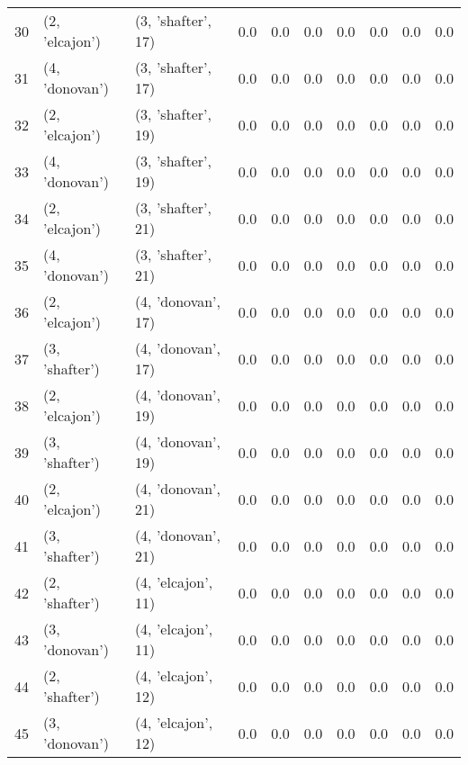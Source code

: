 \begin{tabular}{lllrrrrrrr}
30 &   (2, 'elcajon') &  (3, 'shafter', 17) &      0.0 &        0.0 &      0.0 &      0.0 &      0.0 &        0.0 &       0.0 \\
31 &   (4, 'donovan') &  (3, 'shafter', 17) &      0.0 &        0.0 &      0.0 &      0.0 &      0.0 &        0.0 &       0.0 \\
32 &   (2, 'elcajon') &  (3, 'shafter', 19) &      0.0 &        0.0 &      0.0 &      0.0 &      0.0 &        0.0 &       0.0 \\
33 &   (4, 'donovan') &  (3, 'shafter', 19) &      0.0 &        0.0 &      0.0 &      0.0 &      0.0 &        0.0 &       0.0 \\
34 &   (2, 'elcajon') &  (3, 'shafter', 21) &      0.0 &        0.0 &      0.0 &      0.0 &      0.0 &        0.0 &       0.0 \\
35 &   (4, 'donovan') &  (3, 'shafter', 21) &      0.0 &        0.0 &      0.0 &      0.0 &      0.0 &        0.0 &       0.0 \\
36 &   (2, 'elcajon') &  (4, 'donovan', 17) &      0.0 &        0.0 &      0.0 &      0.0 &      0.0 &        0.0 &       0.0 \\
37 &   (3, 'shafter') &  (4, 'donovan', 17) &      0.0 &        0.0 &      0.0 &      0.0 &      0.0 &        0.0 &       0.0 \\
38 &   (2, 'elcajon') &  (4, 'donovan', 19) &      0.0 &        0.0 &      0.0 &      0.0 &      0.0 &        0.0 &       0.0 \\
39 &   (3, 'shafter') &  (4, 'donovan', 19) &      0.0 &        0.0 &      0.0 &      0.0 &      0.0 &        0.0 &       0.0 \\
40 &   (2, 'elcajon') &  (4, 'donovan', 21) &      0.0 &        0.0 &      0.0 &      0.0 &      0.0 &        0.0 &       0.0 \\
41 &   (3, 'shafter') &  (4, 'donovan', 21) &      0.0 &        0.0 &      0.0 &      0.0 &      0.0 &        0.0 &       0.0 \\
42 &   (2, 'shafter') &  (4, 'elcajon', 11) &      0.0 &        0.0 &      0.0 &      0.0 &      0.0 &        0.0 &       0.0 \\
43 &   (3, 'donovan') &  (4, 'elcajon', 11) &      0.0 &        0.0 &      0.0 &      0.0 &      0.0 &        0.0 &       0.0 \\
44 &   (2, 'shafter') &  (4, 'elcajon', 12) &      0.0 &        0.0 &      0.0 &      0.0 &      0.0 &        0.0 &       0.0 \\
45 &   (3, 'donovan') &  (4, 'elcajon', 12) &      0.0 &        0.0 &      0.0 &      0.0 &      0.0 &        0.0 &       0.0 \\

\end{tabular}
